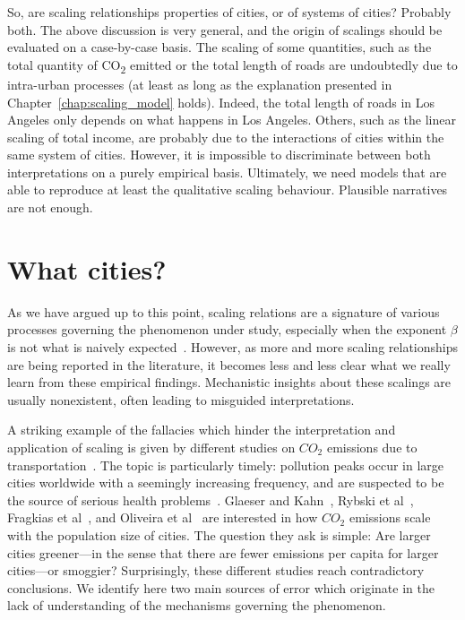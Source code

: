 So, are scaling relationships properties of cities, or of systems of cities?
Probably both. The above discussion is very general, and the origin of scalings
should be evaluated on a case-by-case basis. The scaling of some quantities,
such as the total quantity of CO\textsubscript{2} emitted or the total length of
roads are undoubtedly due to intra-urban processes (at least as long as the
explanation presented in Chapter~\ref{chap:scaling_model} holds). Indeed, the
total length of roads in Los Angeles only depends on what happens in Los
Angeles. Others, such as the linear
scaling of total income, are probably due to the interactions of cities within
the same system of cities. However, it is impossible to discriminate between
both interpretations on a purely empirical basis. Ultimately, we need models that are
able to reproduce at least the qualitative scaling behaviour. Plausible
narratives are not enough.


\section{What cities?}
\label{sec:what_cities_}

As we have argued up to this point, scaling relations are a signature
of various processes governing the phenomenon under study, especially when the exponent
$\beta$ is not what is naively expected~\cite{Barenblatt:1996}. However, as more and more scaling
relationships are being reported in the literature, it becomes less and less clear what we really
learn from these empirical findings. Mechanistic insights about these scalings are usually
nonexistent, often leading to misguided interpretations.


A striking example of the fallacies which hinder the interpretation and
application of scaling is given by different studies on $CO_2$ emissions due to
transportation~\cite{Fragkias:2013,Glaeser:2010,Oliveira:2014,Rybski:2013}. The
topic is particularly timely: pollution peaks occur in large cities worldwide
with a seemingly increasing frequency, and are suspected to be the source of
serious health problems~\cite{Bernstein:2004}. Glaeser and
Kahn~\cite{Glaeser:2010}, Rybski et al~\cite{Rybski:2013}, Fragkias et
al~\cite{Fragkias:2013}, and Oliveira et al~\cite{Oliveira:2014} are interested
in how $CO_2$ emissions scale with the population size of cities. The question
they ask is simple: Are larger cities greener---in the sense that there are
fewer emissions per capita for larger cities---or smoggier? Surprisingly, these
different studies reach contradictory conclusions. We identify here two main
sources of error which originate in the lack of understanding of the mechanisms
governing the phenomenon.

